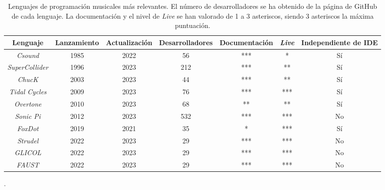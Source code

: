 \begin{table}[t] %
  \begin{center}
  \caption[Lenguajes de programación musicales más relevantes]{Lenguajes de programación musicales más relevantes. El número de desarrolladores se ha obtenido de la página de GitHub de cada lenguaje. La documentación y el nivel de \textit{Live} se han valorado de 1 a 3 asteriscos, siendo 3 asteriscos la máxima puntuación.}
  \begin{tabular}{| c | c | c | c | c | c | c |}
  \hline
  Lenguaje & Lanzamiento & Actualización & Desarrolladores & Documentación & \textit{Live} & Independiente de IDE\\
  \hline
  \textit{Csound} & 1985 & 2022 & 56 & *** & * & Sí\\
  \textit{SuperCollider} & 1996 & 2023 & 212 & *** & ** & Sí\\
  \textit{ChucK} & 2003 & 2023 & 44 & *** & ** & Sí\\
  \textit{Tidal Cycles} & 2009 & 2023 & 76 & *** & *** & Sí\\
  \textit{Overtone} & 2010 & 2023 & 68 & ** & ** & Sí\\
  \textit{Sonic Pi} & 2012 & 2023 & 532 & *** & *** & No\\
  \textit{FoxDot} & 2019 & 2021 & 35 & * & *** & Sí\\
  \textit{Strudel} & 2022 & 2023 & 29 & *** & *** & No\\

  \textit{GLICOL} & 2022 & 2023 & 29 & *** & *** & No\\ %
  \textit{FAUST} & 2022 & 2023 & 29 & *** & *** & No\\ %
  \hline
  \end{tabular}
  .
  \label{tab:lenguajes_comparativa}
  \end{center}
\end{table} 
